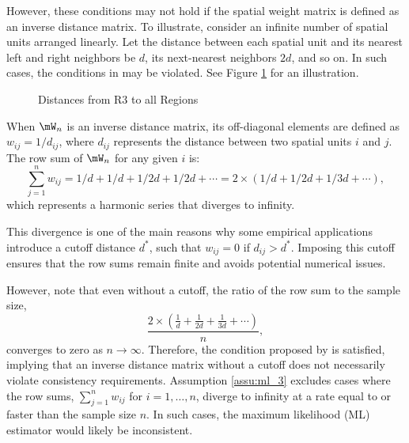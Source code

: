 \documentclass[english,12pt]{book}\usepackage[]{graphicx}\usepackage[]{xcolor}
\begin{document}
However, these conditions may not hold if the spatial weight matrix is defined as an inverse distance matrix. To illustrate, consider an infinite number of spatial units arranged linearly. Let the distance between each spatial unit and its nearest left and right neighbors be $d$, its next-nearest neighbors $2d$, and so on. In such cases, the conditions in \cite{kelejian1998generalized, kelejian1999generalized} may be violated. See Figure \ref{fig:example_lineal} for an illustration. 

\begin{figure}[h]
\caption{Distances from R3 to all Regions}
\label{fig:example_lineal}
\centering
{}
\end{figure}


When $\mW_n$ is an inverse distance matrix, its off-diagonal elements are defined as $w_{ij} = 1/d_{ij}$, where $d_{ij}$ represents the distance between two spatial units $i$ and $j$. The row sum of $\mW_n$ for any given $i$ is:
\begin{equation*}
  \sum_{j = 1}^n w_{ij} = 1/d + 1/d + 1/2d + 1/2d + \cdots = 2 \times (1/d + 1/2d + 1/3d + \cdots),  
\end{equation*}
%
which represents a harmonic series that diverges to infinity. 

This divergence is one of the main reasons why some empirical applications introduce a cutoff distance $d^*$, such that $w_{ij} = 0$ if $d_{ij} > d^*$. Imposing this cutoff ensures that the row sums remain finite and avoids potential numerical issues. 

However, note that even without a cutoff, the ratio of the row sum to the sample size,  
\begin{equation*}  
\frac{2 \times \left( \frac{1}{d} + \frac{1}{2d} + \frac{1}{3d} + \cdots \right)}{n},  
\end{equation*}  
converges to zero as $n \to \infty$. Therefore, the condition proposed by \cite{lee2004asymptotic} is satisfied, implying that an inverse distance matrix without a cutoff does not necessarily violate consistency requirements.  
Assumption \ref{assu:ml_3} excludes cases where the row sums, $\sum_{j=1}^n w_{ij}$ for $i = 1, \ldots, n$, diverge to infinity at a rate equal to or faster than the sample size $n$. In such cases, the maximum likelihood (ML) estimator would likely be inconsistent.  
\end{document}
